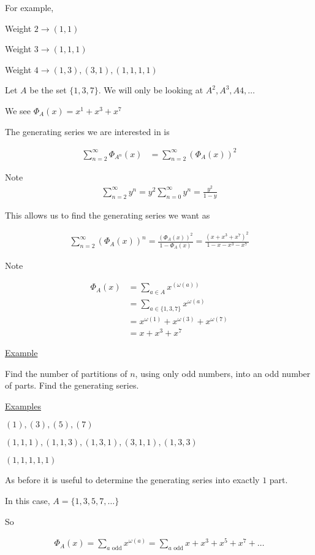 \documentclass{article}
\begin{document}
For example,

Weight $2 \rightarrow (1,1)$ 

Weight $3 \rightarrow (1,1,1)$

Weight $4 \rightarrow (1,3),(3,1),(1,1,1,1)$

Let $A$ be the set $\{1,3,7\}.$ We will only be looking at $A^2, A^3, A4, \ldots$

We see $\Phi_{A}(x) = x^1 + x^3 + x^7$

The generating series we are interested in is

\begin{align*}
\sum_{n=2}^{\infty}\Phi_{A^n}(x)
&= \sum_{n=2}^{\infty}(\Phi_{A}(x))^2
\end{align*}

Note 
\begin{align*}
\sum_{n=2}^{\infty}y^n = y^2\sum_{n=0}^{\infty}y^n = \frac{y^2}{1-y}
\end{align*}

This allows us to find the generating series we want as

\begin{align*}
    \sum_{n=2}^{\infty}(\Phi_{A}(x))^n = \frac{(\Phi_{A}(x))^2}{1-\Phi_{A}(x)} = \frac{(x+x^3+x^7)^2}{1-x-x^3-x^7}
\end{align*}

Note

\begin{align*}
    \Phi_{A}(x) &= \sum_{a \in A}x^{(\omega(a))} \\
    &= \sum_{a \in \{1,3,7\}} x^{\omega(a)} \\
    &= x^{\omega(1)} + x^{\omega(3)} + x^{\omega(7)} \\
    &= x + x^3 + x^7
\end{align*}

\underline{Example}

Find the number of partitions of $n$, using only odd numbers, into an odd number of parts. Find the generating series.

\underline{Examples}

$(1),(3),(5),(7)$

$(1,1,1),(1,1,3),(1,3,1),(3,1,1),(1,3,3)$

$(1,1,1,1,1)$

As before it is useful to determine the generating series into exactly $1$ part. 

In this case, $A = \{1,3,5,7,\ldots\}$

So 

\begin{align*}
    \Phi_{A}(x) = \sum_{a \text{ odd}}x^{\omega(a)} = \sum_{a \text{ odd}} x + x^3 + x^5 + x^7 + \ldots
\end{align*}
\end{document}
